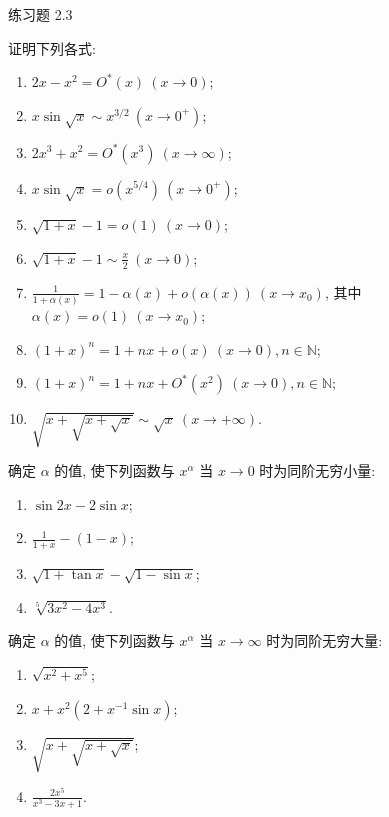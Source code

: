 \begin{exblock}{练习题 2.3}
\item 证明下列各式:
  \begin{enumerate}[label=(\arabic*)]
    \item $2x - x^2 = O^*(x)\ (x \to 0)$;
    \item $x\sin\sqrt{x} \sim x^{3/2}\ (x \to 0^+)$;
    \item $2x^3 + x^2 = O^*(x^3)\ (x \to \infty)$;
    \item $x\sin\sqrt{x} = o(x^{5/4})\ (x \to 0^+)$;
    \item $\sqrt{1+x} - 1 = o(1)\ (x \to 0)$;
    \item $\sqrt{1+x} - 1 \sim \frac{x}{2}\ (x \to 0)$;
    \item $\frac{1}{1+\alpha(x)} = 1 - \alpha(x) + o(\alpha(x))\ (x \to x_0)$, 其中 $\alpha(x) = o(1)\ (x \to x_0)$;
    \item $(1+x)^n = 1 + nx + o(x)\ (x \to 0), n \in \mathbb{N}$;
    \item $(1+x)^n = 1 + nx + O^*(x^2)\ (x \to 0), n \in \mathbb{N}$;
    \item $\sqrt{x + \sqrt{x + \sqrt{x}}} \sim \sqrt{x}\ (x \to +\infty)$.
  \end{enumerate}

\item 确定 $\alpha$ 的值, 使下列函数与 $x^\alpha$ 当 $x \to 0$ 时为同阶无穷小量:
  \begin{enumerate}[label=(\arabic*)]
    \item $\sin 2x - 2\sin x$;
    \item $\frac{1}{1+x} - (1-x)$;
    \item $\sqrt{1+\tan x} - \sqrt{1-\sin x}$;
    \item $\sqrt[5]{3x^2 - 4x^3}$.
  \end{enumerate}

\item 确定 $\alpha$ 的值, 使下列函数与 $x^\alpha$ 当 $x \to \infty$ 时为同阶无穷大量:
  \begin{enumerate}[label=(\arabic*)]
    \item $\sqrt{x^2 + x^5}$;
    \item $x + x^2(2 + x^{-1}\sin x)$;
    \item $\sqrt{x + \sqrt{x + \sqrt{x}}}$;
    \item $\frac{2x^5}{x^3 - 3x + 1}$.
  \end{enumerate}


\end{exblock}
